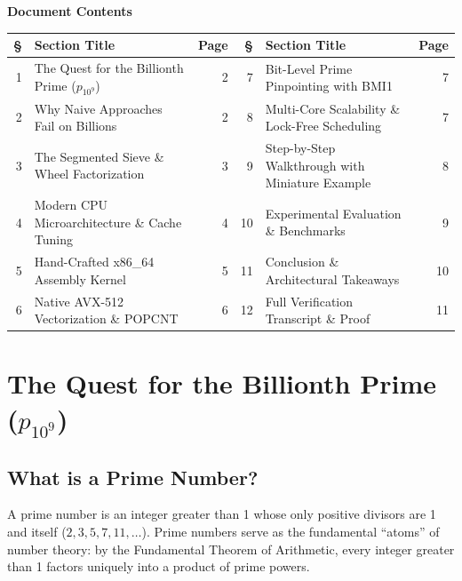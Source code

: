 \documentclass[11pt,a4paper]{article}
\begin{document}
\vspace{-0.2cm}
\begin{center}
\textbf{\large \color{navyblue} Document Contents}
\end{center}
\vspace{-0.3cm}
{
\small
\noindent\begin{tabularx}{\textwidth}{r X r r X r}
\toprule
\textbf{\S} & \textbf{Section Title} & \textbf{Page} & \textbf{\S} & \textbf{Section Title} & \textbf{Page} \\
\midrule
1 & The Quest for the Billionth Prime ($p_{10^9}$) & 2 & 7 & Bit-Level Prime Pinpointing with BMI1 & 7 \\
2 & Why Naive Approaches Fail on Billions & 2 & 8 & Multi-Core Scalability \& Lock-Free Scheduling & 7 \\
3 & The Segmented Sieve \& Wheel Factorization & 3 & 9 & Step-by-Step Walkthrough with Miniature Example & 8 \\
4 & Modern CPU Microarchitecture \& Cache Tuning & 4 & 10 & Experimental Evaluation \& Benchmarks & 9 \\
5 & Hand-Crafted x86\_64 Assembly Kernel & 5 & 11 & Conclusion \& Architectural Takeaways & 10 \\
6 & Native AVX-512 Vectorization \& POPCNT & 6 & 12 & Full Verification Transcript \& Proof & 11 \\
\bottomrule
\end{tabularx}
}

\newpage

\section{The Quest for the Billionth Prime \texorpdfstring{($p_{10^9}$)}{p\_10\textasciicircum 9}}

\subsection{What is a Prime Number?}
A prime number is an integer greater than 1 whose only positive divisors are 1 and itself ($2, 3, 5, 7, 11, \dots$). Prime numbers serve as the fundamental ``atoms'' of number theory: by the Fundamental Theorem of Arithmetic, every integer greater than 1 factors uniquely into a product of prime powers.
\end{document}
